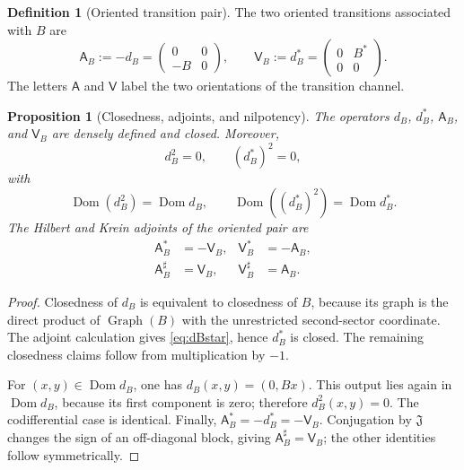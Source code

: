 \documentclass[11pt,reqno]{scrartcl}
\newcommand{\fundJ}{\mathfrak J}
\newcommand{\Aop}{\mathsf A}
\newcommand{\Vop}{\mathsf V}
\DeclareMathOperator{\Dom}{Dom}
\DeclareMathOperator{\Graph}{Graph}
\theoremstyle{plain}
\newtheorem{proposition}[proposition]{Proposition}
\theoremstyle{definition}
\newtheorem{definition}[definition]{Definition}
\theoremstyle{remark}
\begin{document}
\begin{definition}[Oriented transition pair]
\label{def:AV}
The two oriented transitions associated with \(B\) are
\begin{equation}
  \boxed{
  \Aop_B:=-d_B
  =
  \begin{pmatrix}
    0&0\\
    -B&0
  \end{pmatrix},
  \qquad
  \Vop_B:=d_B^*
  =
  \begin{pmatrix}
    0&B^*\\
    0&0
  \end{pmatrix}.}
  \label{eq:AV}
\end{equation}
The letters \(\Aop\) and \(\Vop\) label the two orientations of the
transition channel.
\end{definition}

\begin{proposition}[Closedness, adjoints, and nilpotency]
\label{prop:differential-basic}
The operators \(d_B\), \(d_B^*\), \(\Aop_B\), and \(\Vop_B\) are densely
defined and closed. Moreover,
\begin{equation}
  d_B^2=0,
  \qquad
  (d_B^*)^2=0,
  \label{eq:d-nilpotent}
\end{equation}
with
\begin{equation}
  \Dom(d_B^2)=\Dom d_B,
  \qquad
  \Dom((d_B^*)^2)=\Dom d_B^*.
\end{equation}
The Hilbert and Krein adjoints of the oriented pair are
\begin{align}
  \Aop_B^*&=-\Vop_B,
  &\Vop_B^*&=-\Aop_B,
  \label{eq:AV-Hilbert-adjoint}\\
  \Aop_B^\sharp&=\Vop_B,
  &\Vop_B^\sharp&=\Aop_B.
  \label{eq:AV-Krein-adjoint}
\end{align}
\end{proposition}

\begin{proof}
Closedness of \(d_B\) is equivalent to closedness of \(B\), because its graph
is the direct product of \(\Graph(B)\) with the unrestricted second-sector
coordinate. The adjoint calculation gives \eqref{eq:dBstar}, hence \(d_B^*\)
is closed. The remaining closedness claims follow from multiplication by
\(-1\).

For \((x,y)\in\Dom d_B\), one has \(d_B(x,y)=(0,Bx)\). This output lies again
in \(\Dom d_B\), because its first component is zero; therefore
\(d_B^2(x,y)=0\). The codifferential case is identical. Finally,
\(\Aop_B^*=-d_B^*=-\Vop_B\). Conjugation by \(\fundJ\) changes the sign of an
off-diagonal block, giving \(\Aop_B^\sharp=\Vop_B\); the other identities
follow symmetrically.
\end{proof}
\end{document}
